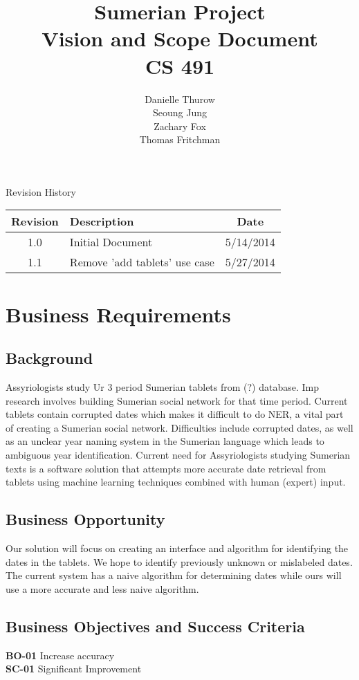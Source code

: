 \documentclass[11pt]{article}
\title{Sumerian Project\\
		Vision and Scope Document\\
		CS 491}
\author{Danielle Thurow \\
		  Seoung Jung\\
		  Zachary Fox\\
		  Thomas Fritchman}
\date{}
\begin{document}
\maketitle
\newpage

\tableofcontents
\newpage

\begin{center}
\Large Revision History\\
\begin{tabularx}{\textwidth}{|c|X|c|}
	\hline
	\textbf{Revision} & \textbf{Description} & \textbf{Date}\\ \hline
	1.0 & Initial Document & 5/14/2014\\ \hline
	1.1 & Remove 'add tablets' use case & 5/27/2014\\ \hline
\end{tabularx}
\end{center}
\newpage

\section{Business Requirements}
\subsection{Background}
Assyriologists study Ur 3 period Sumerian tablets from (?) database. Imp research involves building Sumerian social network for that time period. Current tablets contain corrupted dates which makes it difficult to do NER, a vital part of creating a Sumerian social network. Difficulties include corrupted dates, as well as an unclear year naming system in the Sumerian language which leads to ambiguous year identification. Current need for Assyriologists studying Sumerian texts is a software solution that attempts more accurate date retrieval from tablets using machine learning techniques combined with human (expert) input.
\subsection{Business Opportunity}
Our solution will focus on creating an interface and algorithm for identifying the dates in the tablets. We hope to identify previously unknown or mislabeled dates. The current system has a naive algorithm for determining dates while ours will use a more accurate and less naive algorithm.
\subsection{Business Objectives and Success Criteria}
\textbf{BO-01} Increase accuracy\\
\textbf{SC-01} Significant Improvement
\end{document}
